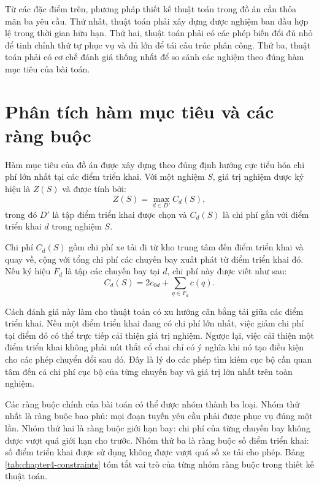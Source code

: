 Từ các đặc điểm trên, phương pháp thiết kế thuật toán trong đồ án cần thỏa mãn ba yêu cầu. Thứ nhất, thuật toán phải xây dựng được nghiệm ban đầu hợp lệ trong thời gian hữu hạn. Thứ hai, thuật toán phải có các phép biến đổi đủ nhỏ để tinh chỉnh thứ tự phục vụ và đủ lớn để tái cấu trúc phân công. Thứ ba, thuật toán phải có cơ chế đánh giá thống nhất để so sánh các nghiệm theo đúng hàm mục tiêu của bài toán.

\section{Phân tích hàm mục tiêu và các ràng buộc}

Hàm mục tiêu của đồ án được xây dựng theo đúng định hướng cực tiểu hóa chi phí lớn nhất tại các điểm triển khai. Với một nghiệm $S$, giá trị nghiệm được ký hiệu là $Z(S)$ và được tính bởi:
\begin{equation}
    Z(S) = \max_{d \in D'} C_d(S),
    \label{eq:chapter4-objective-analysis}
\end{equation}
trong đó $D'$ là tập điểm triển khai được chọn và $C_d(S)$ là chi phí gắn với điểm triển khai $d$ trong nghiệm $S$.

Chi phí $C_d(S)$ gồm chi phí xe tải đi từ kho trung tâm đến điểm triển khai và quay về, cộng với tổng chi phí các chuyến bay xuất phát từ điểm triển khai đó. Nếu ký hiệu $F_d$ là tập các chuyến bay tại $d$, chi phí này được viết như sau:
\begin{equation}
    C_d(S) = 2c_{0d} + \sum_{q \in F_d} c(q).
    \label{eq:chapter4-launch-cost-analysis}
\end{equation}

Cách đánh giá này làm cho thuật toán có xu hướng cân bằng tải giữa các điểm triển khai. Nếu một điểm triển khai đang có chi phí lớn nhất, việc giảm chi phí tại điểm đó có thể trực tiếp cải thiện giá trị nghiệm. Ngược lại, việc cải thiện một điểm triển khai không phải nút thắt cổ chai chỉ có ý nghĩa khi nó tạo điều kiện cho các phép chuyển đổi sau đó. Đây là lý do các phép tìm kiếm cục bộ cần quan tâm đến cả chi phí cục bộ của từng chuyến bay và giá trị lớn nhất trên toàn nghiệm.

Các ràng buộc chính của bài toán có thể được nhóm thành ba loại. Nhóm thứ nhất là ràng buộc bao phủ: mọi đoạn tuyến yêu cầu phải được phục vụ đúng một lần. Nhóm thứ hai là ràng buộc giới hạn bay: chi phí của từng chuyến bay không được vượt quá giới hạn cho trước. Nhóm thứ ba là ràng buộc số điểm triển khai: số điểm triển khai được sử dụng không được vượt quá số xe tải cho phép. Bảng \ref{tab:chapter4-constraints} tóm tắt vai trò của từng nhóm ràng buộc trong thiết kế thuật toán.

